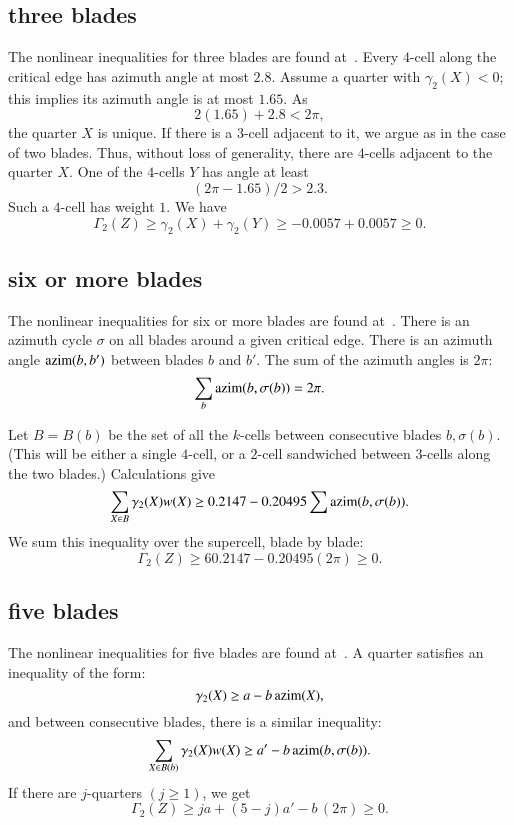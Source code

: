 \subsection{three blades}

The nonlinear inequalities for three blades are found at~\cite[cc:3bl]{hales:2009:nonlinear}.
Every $4$-cell along the critical edge has azimuth
angle at most $2.8$.  Assume a quarter with $\gamma_2(X) <0$;
this implies
its azimuth angle is at most $1.65$.
As
$$
2 (1.65) + 2.8 < 2 \pi,
$$
the quarter $X$ is unique.  If there is a $3$-cell adjacent
to it, we argue as in the case of two blades.  Thus, without loss of generality, there are $4$-cells adjacent to the quarter $X$.  One of the $4$-cells $Y$ has angle at least
$$
(2\pi - 1.65)/2 > 2.3.
$$
Such a $4$-cell has weight $1$.
We have
$$
\Gamma_2(Z)\ge \gamma_2(X) + \gamma_2(Y) \ge -0.0057 + 0.0057 \ge0.
$$

\subsection{six or more blades}

The nonlinear inequalities for six or more blades are found at~\cite[cc:6bl]{hales:2009:nonlinear}.
There is an azimuth cycle $\sigma$
on all blades around a given critical edge.  There is an azimuth
angle ${\operatorname{azim}}(b,b')$ between blades $b$ and $b'$.  The sum
of the azimuth angles is $2\pi$:
$$
\sum_b {\operatorname{azim}}(b,\sigma(b)) = 2\pi.
$$

Let $B=B(b)$ be the set of all the $k$-cells between consecutive
blades $b,\sigma(b)$.    (This will be either a single $4$-cell, or a $2$-cell sandwiched between $3$-cells along
the two blades.)  Calculations give
$$\sum_{X\in B} \gamma_2(X) w(X) \ge 0.2147 - 0.20495\sum {\operatorname{azim}}(b,\sigma(b)).$$
We sum this inequality over the supercell, blade by blade:
$$
\Gamma_2(Z) \ge 6 0.2147 - 0.20495 (2\pi) \ge 0.
$$


\subsection{five blades}

The nonlinear inequalities for five blades are found at~\cite[cc:5bl]{hales:2009:nonlinear}.
A quarter satisfies an inequality of the form:
$$
\gamma_2(X) \ge a - b\, {\operatorname{azim}}(X),
$$
and 
between consecutive blades, there is a
similar inequality:
$$
\sum_{X\in B(b)} \gamma_2(X)w(X) \ge a' - b\,{\operatorname{azim}}(b,\sigma(b)).
$$
If there are $j$-quarters $(j\ge1)$, we get
$$
\Gamma_2(Z) \ge j a + (5-j) a' - b\, (2\pi) \ge 0.
$$

